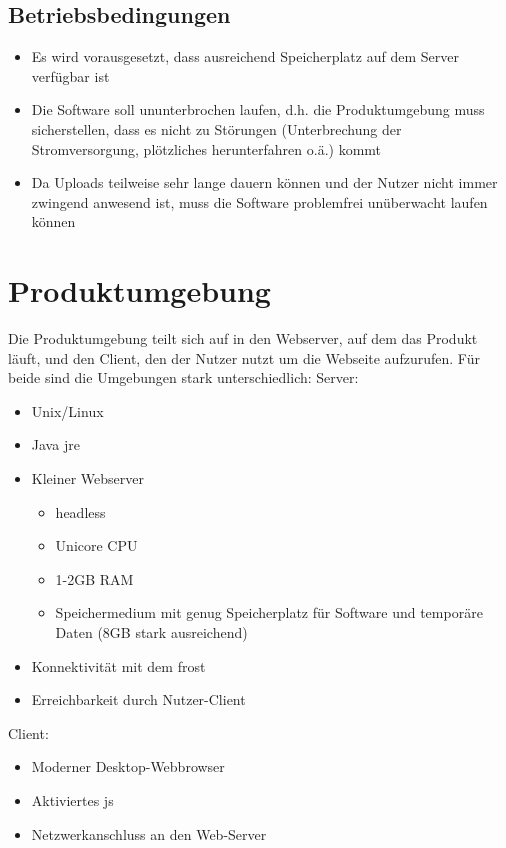 \documentclass[a4paper, 12 pt]{article}
\begin{document}
\subsection{Betriebsbedingungen}
\begin{itemize}
	\item Es wird vorausgesetzt, dass ausreichend Speicherplatz auf dem Server verfügbar ist
	\item Die Software soll ununterbrochen laufen, d.h. die Produktumgebung muss sicherstellen, dass es nicht zu Störungen (Unterbrechung der Stromversorgung, plötzliches herunterfahren o.ä.) kommt
	\item Da Uploads teilweise sehr lange dauern können und der Nutzer nicht immer zwingend anwesend ist, muss die Software problemfrei unüberwacht laufen können
\end{itemize}
	
\section{Produktumgebung}
Die Produktumgebung teilt sich auf in den Webserver, auf dem das Produkt läuft, und den Client, den der Nutzer nutzt um die Webseite aufzurufen. Für beide sind die Umgebungen stark unterschiedlich:
Server:
\begin{itemize}
	\item Unix/Linux
	\item Java \gls{jre}
	\item Kleiner Webserver
	\begin{itemize}
		\item \gls{headless}
		\item Unicore CPU
		\item 1-2GB RAM
		\item Speichermedium mit genug Speicherplatz für Software und temporäre Daten (8GB stark ausreichend)
	\end{itemize}
	\item Konnektivität mit dem \gls{frost}
	\item Erreichbarkeit durch Nutzer-Client
\end{itemize}

\noindent Client:

\begin{itemize}
	\item Moderner Desktop-Webbrowser
	\item Aktiviertes \gls{js}
	\item Netzwerkanschluss an den Web-Server
\end{itemize}
\end{document}
